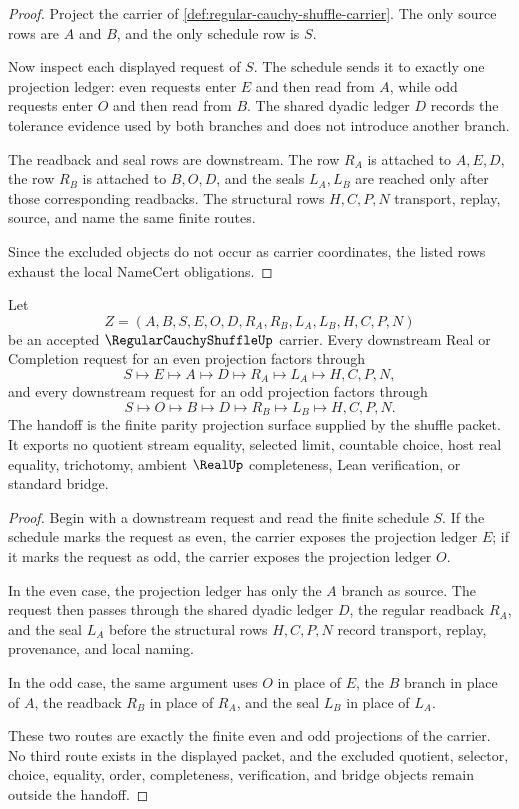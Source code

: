 \begin{proof}
Project the carrier of \autoref{def:regular-cauchy-shuffle-carrier}. The only source rows are $A$ and $B$, and the only schedule row is $S$.

Now inspect each displayed request of $S$. The schedule sends it to exactly one projection ledger: even requests enter $E$ and then read from $A$, while odd requests enter $O$ and then read from $B$. The shared dyadic ledger $D$ records the tolerance evidence used by both branches and does not introduce another branch.

The readback and seal rows are downstream. The row $R_A$ is attached to $A,E,D$, the row $R_B$ is attached to $B,O,D$, and the seals $L_A,L_B$ are reached only after those corresponding readbacks. The structural rows $H,C,P,N$ transport, replay, source, and name the same finite routes.

Since the excluded objects do not occur as carrier coordinates, the listed rows exhaust the local NameCert obligations.
\end{proof}

\begin{theorem}
\label{thm:regular-cauchy-shuffle-even-odd-projection-handoff}
Let
$$
Z=(A,B,S,E,O,D,R_A,R_B,L_A,L_B,H,C,P,N)
$$
be an accepted $\RegularCauchyShuffleUp$ carrier. Every downstream Real or Completion request for an even projection factors through
$$
S \longmapsto E \longmapsto A \longmapsto D \longmapsto R_A \longmapsto L_A \longmapsto H,C,P,N ,
$$
and every downstream request for an odd projection factors through
$$
S \longmapsto O \longmapsto B \longmapsto D \longmapsto R_B \longmapsto L_B \longmapsto H,C,P,N .
$$
The handoff is the finite parity projection surface supplied by the shuffle packet. It exports no quotient stream equality, selected limit, countable choice, host real equality, trichotomy, ambient $\RealUp$ completeness, Lean verification, or standard bridge.
\end{theorem}
\begin{proof}
Begin with a downstream request and read the finite schedule $S$. If the schedule marks the request as even, the carrier exposes the projection ledger $E$; if it marks the request as odd, the carrier exposes the projection ledger $O$.

In the even case, the projection ledger has only the $A$ branch as source. The request then passes through the shared dyadic ledger $D$, the regular readback $R_A$, and the seal $L_A$ before the structural rows $H,C,P,N$ record transport, replay, provenance, and local naming.

In the odd case, the same argument uses $O$ in place of $E$, the $B$ branch in place of $A$, the readback $R_B$ in place of $R_A$, and the seal $L_B$ in place of $L_A$.

These two routes are exactly the finite even and odd projections of the carrier. No third route exists in the displayed packet, and the excluded quotient, selector, choice, equality, order, completeness, verification, and bridge objects remain outside the handoff.
\end{proof}

